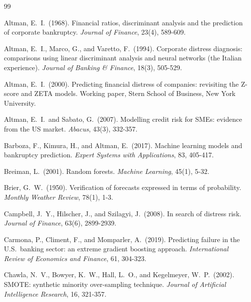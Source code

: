 \documentclass[12pt,a4paper]{article}
\begin{document}

\clearpage
\begin{thebibliography}{99}

Altman, E.\ I.\ (1968).
\newblock Financial ratios, discriminant analysis and the prediction of
corporate bankruptcy.
\newblock \textit{Journal of Finance}, 23(4), 589-609.

Altman, E.\ I., Marco, G., and Varetto, F.\ (1994).
\newblock Corporate distress diagnosis: comparisons using linear discriminant
analysis and neural networks (the Italian experience).
\newblock \textit{Journal of Banking \& Finance}, 18(3), 505-529.

Altman, E.\ I.\ (2000).
\newblock Predicting financial distress of companies: revisiting the Z-score
and ZETA models.
\newblock Working paper, Stern School of Business, New York University.

Altman, E.\ I.\ and Sabato, G.\ (2007).
\newblock Modelling credit risk for SMEs: evidence from the US market.
\newblock \textit{Abacus}, 43(3), 332-357.

Barboza, F., Kimura, H., and Altman, E.\ (2017).
\newblock Machine learning models and bankruptcy prediction.
\newblock \textit{Expert Systems with Applications}, 83, 405-417.

Breiman, L.\ (2001).
\newblock Random forests.
\newblock \textit{Machine Learning}, 45(1), 5-32.

Brier, G.\ W.\ (1950).
\newblock Verification of forecasts expressed in terms of probability.
\newblock \textit{Monthly Weather Review}, 78(1), 1-3.

Campbell, J.\ Y., Hilscher, J., and Szilagyi, J.\ (2008).
\newblock In search of distress risk.
\newblock \textit{Journal of Finance}, 63(6), 2899-2939.

Carmona, P., Climent, F., and Momparler, A.\ (2019).
\newblock Predicting failure in the U.S.\ banking sector: an extreme gradient
boosting approach.
\newblock \textit{International Review of Economics and Finance}, 61, 304-323.

Chawla, N.\ V., Bowyer, K.\ W., Hall, L.\ O., and Kegelmeyer, W.\ P.\ (2002).
\newblock SMOTE: synthetic minority over-sampling technique.
\newblock \textit{Journal of Artificial Intelligence Research}, 16, 321-357.


\end{thebibliography}
\end{document}
